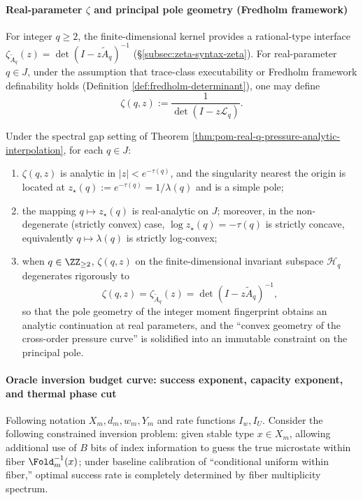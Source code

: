 \paragraph{Real-parameter \texorpdfstring{$\zeta$}{zeta} and principal pole geometry (Fredholm framework)}
For integer \(q\ge 2\), the finite-dimensional kernel provides a rational-type interface \(\zeta_{\widetilde A_q}(z)=\det(I-z\widetilde A_q)^{-1}\) (\S\ref{subsec:zeta-syntax-zeta}).
For real-parameter \(q\in J\), under the assumption that trace-class executability or Fredholm framework definability holds (Definition \ref{def:fredholm-determinant}), one may define
\[
\zeta(q,z):=\frac{1}{\det(I-z\mathcal{L}_q)}.
\]

\begin{proposition}\label{prop:pom-real-q-zeta-main-pole}
Under the spectral gap setting of Theorem \ref{thm:pom-real-q-pressure-analytic-interpolation}, for each \(q\in J\):
\begin{enumerate}
  \item \(\zeta(q,z)\) is analytic in \(|z|<e^{-\tau(q)}\), and the singularity nearest the origin is located at
  \(
  z_\star(q):=e^{-\tau(q)}=1/\lambda(q)
  \)
  and is a simple pole;
  \item the mapping \(q\mapsto z_\star(q)\) is real-analytic on \(J\); moreover, in the non-degenerate (strictly convex) case, \(\log z_\star(q)=-\tau(q)\) is strictly concave, equivalently \(q\mapsto \lambda(q)\) is strictly log-convex;
  \item when \(q\in\ZZ_{\ge 2}\), \(\zeta(q,z)\) on the finite-dimensional invariant subspace \(\mathcal{H}_q\) degenerates rigorously to
  \[
  \zeta(q,z)=\zeta_{\widetilde A_q}(z)=\det(I-z\widetilde A_q)^{-1},
  \]
  so that the pole geometry of the integer moment fingerprint obtains an analytic continuation at real parameters, and the ``convex geometry of the cross-order pressure curve'' is solidified into an immutable constraint on the principal pole.
\end{enumerate}
\end{proposition}



\paragraph{Oracle inversion budget curve: success exponent, capacity exponent, and thermal phase cut}
Following notation \(X_m,d_m,w_m,Y_m\) and rate functions \(I_w,I_U\).
Consider the following constrained inversion problem: given stable type \(x\in X_m\), allowing additional use of \(B\) bits of index information to guess the true microstate within fiber \(\Fold_m^{-1}(x)\); under baseline calibration of ``conditional uniform within fiber,'' optimal success rate is completely determined by fiber multiplicity spectrum.


